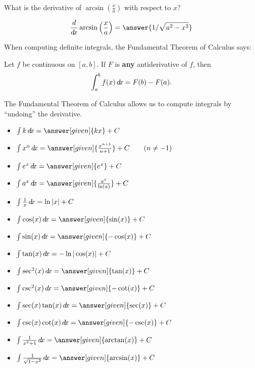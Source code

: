 \documentclass{ximera}
\begin{document}
\begin{question} %
  What is the derivative of $\arcsin\left(\frac{x}{a}\right)$ with respect to $x$?
  \begin{prompt} 
    \[
    \ddx \arcsin\left(\frac{x}{a}\right) = \answer{1/\sqrt{a^2 - x^2}}
    \]
  \end{prompt}
\end{question}

When computing definite integrals, the Fundamental Theorem of Calculus
says:

\begin{theorem}
  Let $f$ be continuous on $[a,b]$. If $F$ is \textbf{any}
  antiderivative of $f$, then
  \[
  \int_a^b f(x)\mathop{}\!d\! x = F(b)-F(a).
  \]
\end{theorem}

The Fundamental Theorem of Calculus allows us to compute
integrals by ``undoing'' the derivative.

\begin{theorem}\hfil
\begin{itemize}
\item $\int k \d x= \answer[given]{k x}+C$
\item $\int x^n \d x= \answer[given]{\frac{x^{n+1}}{n+1}}+C\qquad(n\ne-1)$
\item $\int e^x \d x= \answer[given]{e^x} + C$
\item $\int a^x \d x= \answer[given]{\frac{a^x}{\ln(a)}}+C$
\item $\int \frac{1}{x} \mathop{}\!d\! x= \ln|x|+C$
\item $\int \cos(x) \d x = \answer[given]{\sin(x)} + C$
\item $\int \sin(x) \d x = \answer[given]{-\cos(x)} + C$  
\item $\int \tan(x) \mathop{}\!d\! x = -\ln|\cos(x)| + C$
\item $\int \sec^2(x) \d x = \answer[given]{\tan(x)} + C$
\item $\int \csc^2(x) \d x = \answer[given]{-\cot(x)} + C$
\item $\int \sec(x)\tan(x) \d x = \answer[given]{\sec(x)} + C$
\item $\int \csc(x)\cot(x) \d x = \answer[given]{-\csc(x)} + C$
\item $\int \frac{1}{x^2+1}\d x = \answer[given]{\arctan(x)} + C$
\item $\int \frac{1}{\sqrt{1-x^2}}\d x= \answer[given]{\arcsin(x)}+C$
\end{itemize}
\end{theorem}
\end{document}
